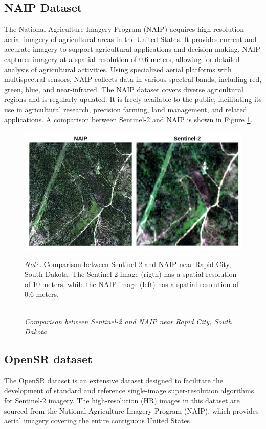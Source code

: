 \subsection{NAIP Dataset}
The National Agriculture Imagery Program (NAIP) acquires high-resolution aerial imagery of agricultural areas in the United States. It provides current and accurate imagery to support agricultural applications and decision-making. NAIP captures imagery at a spatial resolution of 0.6 meters, allowing for detailed analysis of agricultural activities. Using specialized aerial platforms with multispectral sensors, NAIP collects data in various spectral bands, including red, green, blue, and near-infrared. The NAIP dataset covers diverse agricultural regions and is regularly updated. It is freely available to the public, facilitating its use in agricultural research, precision farming, land management, and related applications. A comparison between Sentinel-2 and NAIP is shown in Figure \ref{fig:naip_comparison}.

\begin{figure}[H] 
    \caption{\doublespacing \\ \textit{Comparison between Sentinel-2 and NAIP near Rapid City, South Dakota.}} 
    \centering
    \includegraphics[width=1\linewidth]{images/csaybar_fig02.png}
    \begin{justify}
        \textit{Note.} Comparison between Sentinel-2 and NAIP near Rapid City, South Dakota. The Sentinel-2 image (rigth) has a spatial resolution of 10 meters, while the NAIP image (left) has a spatial resolution of 0.6 meters.
    \end{justify}                    
    \label{fig:naip_comparison}
\end{figure}


\subsection{OpenSR dataset}
The OpenSR dataset is an extensive dataset designed to facilitate the development of standard and reference single-image super-resolution algorithms for Sentinel-2 imagery. The high-resolution (HR) images in this dataset are sourced from the National Agriculture Imagery Program (NAIP), which provides aerial imagery covering the entire contiguous United States.

